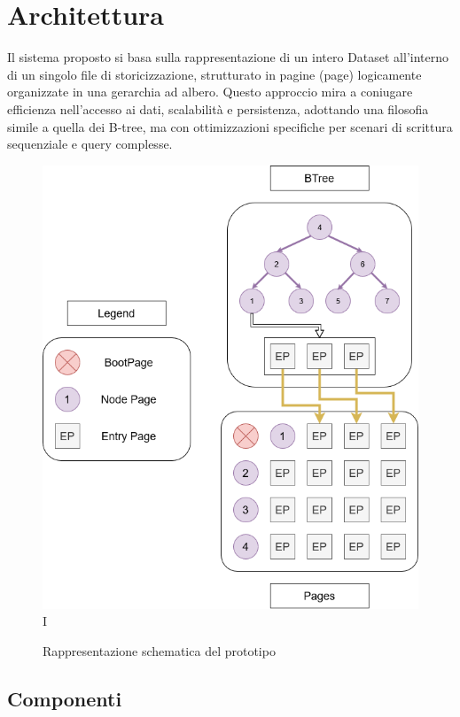 \documentclass[12pt,a4paper,openright,twoside]{book}
\begin{document}
    \section{Architettura}
        Il sistema proposto si basa sulla rappresentazione di un intero Dataset all’interno di un singolo file di storicizzazione, strutturato in pagine (page) logicamente organizzate in una gerarchia ad albero. Questo approccio mira a coniugare efficienza nell’accesso ai dati, scalabilità e persistenza, adottando una filosofia simile a quella dei B-tree, ma con ottimizzazioni specifiche per scenari di scrittura sequenziale e query complesse.

        \begin{figure} [h]
            \centering
            \includegraphics[width=.5\linewidth]{figures/Prototipo.png}
I              \caption{Rappresentazione schematica del prototipo}
            \label{fig:prototipo}
        \end{figure}

        \subsection{Componenti}
\end{document}
